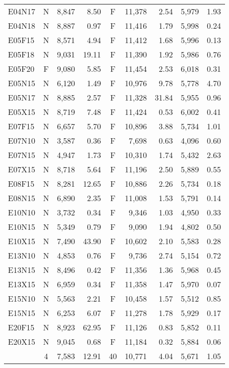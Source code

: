 \begin{table}[htpb]
\begin{tabular}{lcrrcrrrr}
E04N17 & N & 8,847 & 8.50 & F & 11,378 & 2.54 & 5,979 & 1.93 \\
E04N18 & N & 8,887 & 0.97 & F & 11,416 & 1.79 & 5,998 & 0.24 \\
E05F15 & N & 8,571 & 4.94 & F & 11,412 & 1.68 & 5,996 & 0.13 \\
E05F18 & N & 9,031 & 19.11 & F & 11,390 & 1.92 & 5,986 & 0.76 \\
E05F20 & F & 9,080 & 5.85 & F & 11,454 & 2.53 & 6,018 & 0.31 \\
E05N15 & N & 6,120 & 1.49 & F & 10,976 & 9.78 & 5,778 & 4.70 \\
E05N17 & N & 8,885 & 2.57 & F & 11,328 & 31.84 & 5,955 & 0.96 \\
E05X15 & N & 8,719 & 7.48 & F & 11,424 & 0.53 & 6,002 & 0.41 \\
E07F15 & N & 6,657 & 5.70 & F & 10,896 & 3.88 & 5,734 & 1.01 \\
E07N10 & N & 3,587 & 0.36 & F & 7,698 & 0.63 & 4,096 & 0.60 \\
E07N15 & N & 4,947 & 1.73 & F & 10,310 & 1.74 & 5,432 & 2.63 \\
E07X15 & N & 8,718 & 5.64 & F & 11,196 & 2.50 & 5,889 & 0.55 \\
E08F15 & N & 8,281 & 12.65 & F & 10,886 & 2.26 & 5,734 & 0.18 \\
E08N15 & N & 6,890 & 2.35 & F & 11,008 & 1.53 & 5,791 & 0.14 \\
E10N10 & N & 3,732 & 0.34 & F & 9,346 & 1.03 & 4,950 & 0.33 \\
E10N15 & N & 5,349 & 0.79 & F & 9,090 & 1.94 & 4,802 & 0.50 \\
E10X15 & N & 7,490 & 43.90 & F & 10,602 & 2.10 & 5,583 & 0.28 \\
E13N10 & N & 4,853 & 0.76 & F & 9,736 & 2.74 & 5,154 & 0.72 \\
E13N15 & N & 8,496 & 0.42 & F & 11,356 & 1.36 & 5,968 & 0.45 \\
E13X15 & N & 6,959 & 0.34 & F & 11,358 & 1.47 & 5,970 & 0.07 \\
E15N10 & N & 5,563 & 2.21 & F & 10,458 & 1.57 & 5,512 & 0.85 \\
E15N15 & N & 6,253 & 6.07 & F & 11,278 & 1.78 & 5,929 & 0.17 \\
E20F15 & N & 8,923 & 62.95 & F & 11,126 & 0.83 & 5,852 & 0.11 \\
E20X15 & N & 9,045 & 0.68 & F & 11,184 & 0.32 & 5,884 & 0.06 \\
\cmidrule{2-9}
& 4 & 7,583 & 12.91 & 40 & 10,771 & 4.04 & 5,671 & 1.05\\
\hline
\end{tabular}
\end{table}

